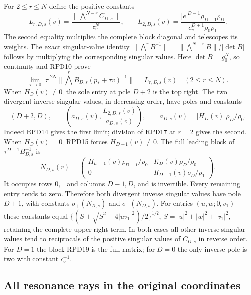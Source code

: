 For $2\le r\le N$ define the positive constants
\[
 L_{r,D,s}(v)=\frac{\|\bigwedge^{N-r}C_{D,s}\|}{c_v^N},\qquad
 L_{2,D,s}(v)=\frac{|e|^{D-1}\rho_{D-1}\rho_D}
                       {c_v^{D+1}\rho_0\rho_1}.\tag{RPD16}
\]
The second equality multiplies the complete block diagonal and
telescopes its weights.  The exact singular-value identity
$\|\bigwedge^rB^{-1}\|=\|\bigwedge^{N-r}B\|/|\det B|$ follows
by multiplying the corresponding singular values.  Here
$\det B=g_0^N$, so continuity and RPD10 prove
\[
 \lim_{\tau\to0}|\tau|^{2N}
  \|\bigwedge^rB_{D,s}(p_*+\tau v)^{-1}\|=L_{r,D,s}(v)
  \quad(2\le r\le N).\tag{RPD17}
\]
When $H_D(v)\ne0$, the sole entry at pole $D+2$ is the top right.
The two divergent inverse singular values, in decreasing order,
have poles and constants
\[
 (D+2,D),\qquad
 \left(a_{D,s}(v),\frac{L_{2,D,s}(v)}{a_{D,s}(v)}\right),\qquad
 a_{D,s}(v)=|H_D(v)|\rho_D/\rho_0.\tag{RPD18}
\]
Indeed RPD14 gives the first limit; division of RPD17 at $r=2$
gives the second.  When $H_D(v)=0$, RPD15 forces $H_{D-1}(v)\ne0$.
The full leading block of $\tau^{D+1}B_{D,s}^{-1}$ is
\[
 N_{D,s}(v)=\begin{pmatrix}
 H_{D-1}(v)\rho_{D-1}/\rho_0&K_D(v)\rho_D/\rho_0\\
 0&H_{D-1}(v)\rho_D/\rho_1
 \end{pmatrix}.\tag{RPD19}
\]
It occupies rows $0,1$ and columns $D-1,D$, and is invertible.
Every remaining entry tends to zero.  Therefore both divergent
inverse singular values have pole $D+1$, with constants
$\sigma_+(N_{D,s})$ and $\sigma_-(N_{D,s})$.
For entries $(u,w;0,v_1)$ these constants equal
$\{(S\pm\sqrt{S^2-4|uv_1|^2})/2\}^{1/2}$,
$S=|u|^2+|w|^2+|v_1|^2$, retaining the complete upper-right term.
In both cases all other inverse singular values tend to reciprocals
of the positive singular values of $C_{D,s}$ in reverse order.
For $D=1$ the block RPD19 is the full matrix; for $D=0$ the only
inverse pole is two with constant $c_v^{-1}$.

\subsection{All resonance rays in the original coordinates}

